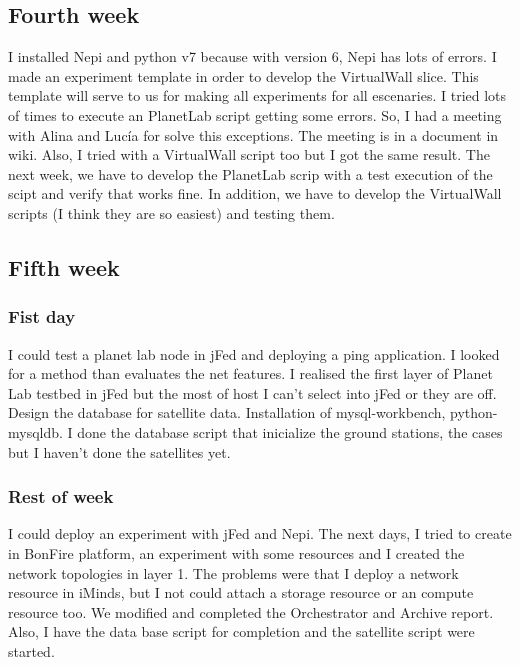 \subsection{Fourth week}
I installed Nepi\cite{Nepi} and python v7 because with version 6, Nepi has lots of errors.
I made an experiment template in order to develop the VirtualWall slice. This template will serve to us for making all experiments for all escenaries.
I tried lots of times to execute an PlanetLab\cite{PLE} script getting some errors. So, I had a meeting with Alina and Lucía for solve this exceptions.
The meeting is in a document in wiki.
Also, I tried with a VirtualWall script too but I got the same result.
The next week, we have to develop the PlanetLab scrip with a test execution of the scipt and verify that works fine.
In addition, we have to develop the VirtualWall scripts (I think they are so easiest) and testing them.

\subsection{Fifth week}
\subsubsection{Fist day}

I could test a planet lab node in jFed and deploying a ping application.
I looked for a method than evaluates the net features.
I realised the first layer of Planet Lab testbed in jFed but the most of host I can't select into jFed or they are off.
Design the database for satellite data.
Installation of mysql-workbench, python-mysqldb.
I done the database script that inicialize the ground stations, the cases but I haven't done the satellites yet.


\subsubsection{Rest of week}
I could deploy an experiment with jFed and Nepi.
The next days, I tried to create in BonFire platform, an experiment with some resources and I created the network topologies in layer 1. The problems were that I deploy a network resource in iMinds, but I not could attach a storage resource or an compute resource too.
We modified and completed the Orchestrator and Archive report.
Also, I have the data base script for completion and the satellite script were started.
